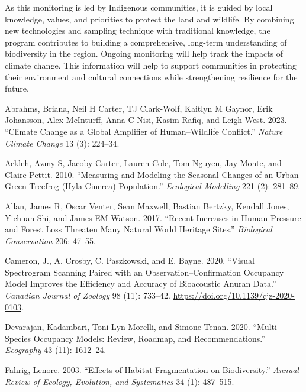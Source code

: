 \documentclass[
  letterpaper,
  DIV=11,
  numbers=noendperiod,
  oneside]{scrartcl}
\newlength{\cslhangindent}
\newenvironment{CSLReferences}[2] %
 {\begin{list}{}{%
  \setlength{\itemindent}{0pt}
  \setlength{\leftmargin}{0pt}
  \setlength{\parsep}{0pt}
  \ifodd #1
   \setlength{\leftmargin}{\cslhangindent}
   \setlength{\itemindent}{-1\cslhangindent}
  \fi
  \setlength{\itemsep}{#2\baselineskip}}}
 {\end{list}}
\begin{document}
As this monitoring is led by Indigenous communities, it is guided by
local knowledge, values, and priorities to protect the land and
wildlife. By combining new technologies and sampling technique with
traditional knowledge, the program contributes to building a
comprehensive, long-term understanding of biodiversity in the region.
Ongoing monitoring will help track the impacts of climate change. This
information will help to support communities in protecting their
environment and cultural connections while strengthening resilience for
the future.

\label{refs}
\begin{CSLReferences}{1}{0}
Abrahms, Briana, Neil H Carter, TJ Clark-Wolf, Kaitlyn M Gaynor, Erik
Johansson, Alex McInturff, Anna C Nisi, Kasim Rafiq, and Leigh West.
2023. {``Climate Change as a Global Amplifier of Human--Wildlife
Conflict.''} \emph{Nature Climate Change} 13 (3): 224--34.

Ackleh, Azmy S, Jacoby Carter, Lauren Cole, Tom Nguyen, Jay Monte, and
Claire Pettit. 2010. {``Measuring and Modeling the Seasonal Changes of
an Urban Green Treefrog (Hyla Cinerea) Population.''} \emph{Ecological
Modelling} 221 (2): 281--89.

Allan, James R, Oscar Venter, Sean Maxwell, Bastian Bertzky, Kendall
Jones, Yichuan Shi, and James EM Watson. 2017. {``Recent Increases in
Human Pressure and Forest Loss Threaten Many Natural World Heritage
Sites.''} \emph{Biological Conservation} 206: 47--55.

Cameron, J., A. Crosby, C. Paszkowski, and E. Bayne. 2020. {``Visual
Spectrogram Scanning Paired with an Observation--Confirmation Occupancy
Model Improves the Efficiency and Accuracy of Bioacoustic Anuran
Data.''} \emph{Canadian Journal of Zoology} 98 (11): 733--42.
\url{https://doi.org/10.1139/cjz-2020-0103}.

Devarajan, Kadambari, Toni Lyn Morelli, and Simone Tenan. 2020.
{``Multi-Species Occupancy Models: Review, Roadmap, and
Recommendations.''} \emph{Ecography} 43 (11): 1612--24.

Fahrig, Lenore. 2003. {``Effects of Habitat Fragmentation on
Biodiversity.''} \emph{Annual Review of Ecology, Evolution, and
Systematics} 34 (1): 487--515.


\end{CSLReferences}
\end{document}
